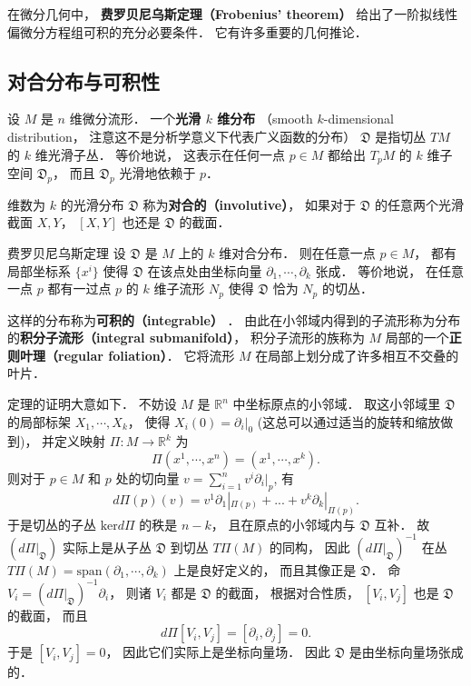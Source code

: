 

在微分几何中， \textbf{费罗贝尼乌斯定理（Frobenius' theorem）} 给出了一阶拟线性偏微分方程组可积的充分必要条件． 它有许多重要的几何推论．

\subsection{对合分布与可积性}
设 $M$ 是 $n$ 维微分流形． 一个\textbf{光滑 $k$ 维分布} （smooth $k$-dimensional distribution， 注意这不是分析学意义下代表广义函数的分布） $\mathfrak{D}$ 是指切丛 $TM$ 的 $k$ 维光滑子丛． 等价地说， 这表示在任何一点 $p\in M$ 都给出 $T_pM$ 的 $k$ 维子空间 $\mathfrak{D}_p$， 而且 $\mathfrak{D}_p$ 光滑地依赖于 $p$．

维数为 $k$ 的光滑分布 $\mathfrak{D}$ 称为\textbf{对合的（involutive）}， 如果对于 $\mathfrak{D}$ 的任意两个光滑截面 $X,Y$， $[X,Y]$ 也还是 $\mathfrak{D}$ 的截面． 

\begin{theorem}{费罗贝尼乌斯定理}
设 $\mathfrak{D}$ 是 $M$ 上的 $k$ 维对合分布． 则在任意一点 $p\in M$， 都有局部坐标系 $\{x^i\}$ 使得 $\mathfrak{D}$ 在该点处由坐标向量 $\partial_1,\cdots ,\partial_k$ 张成． 等价地说， 在任意一点 $p$ 都有一过点 $p$ 的 $k$ 维子流形 $N_p$ 使得 $\mathfrak{D}$ 恰为 $N_p$ 的切丛．
\end{theorem}
这样的分布称为\textbf{可积的（integrable）} ． 由此在小邻域内得到的子流形称为分布的\textbf{积分子流形（integral submanifold）}， 积分子流形的族称为 $M$ 局部的一个\textbf{正则叶理（regular foliation）}． 它将流形 $M$ 在局部上划分成了许多相互不交叠的叶片．

定理的证明大意如下． 不妨设 $M$ 是 $\mathbb{R}^n$ 中坐标原点的小邻域． 取这小邻域里 $\mathfrak{D}$ 的局部标架 $X_1,\cdots ,X_k$， 使得 $X_i(0)=\partial_i|_0$ (这总可以通过适当的旋转和缩放做到)， 并定义映射 $\Pi: M\to \mathbb{R}^k$ 为
$$
\Pi(x^1,\cdots ,x^n)=(x^1,\cdots ,x^k).
$$
则对于 $p\in M$ 和 $p$ 处的切向量 $v=\sum_{i=1}^nv^i\partial_i|_p$, 有
$$
d\Pi(p)(v)=v^1\partial_1|_{\Pi(p)}+...+v^k\partial_k|_{\Pi(p)}.
$$
于是切丛的子丛 $\text{ker}d\Pi$ 的秩是 $n-k$， 且在原点的小邻域内与 $\mathfrak{D}$ 互补． 故 $(d\Pi|_{\mathfrak{D}})$ 实际上是从子丛 $\mathfrak{D}$ 到切丛 $T\Pi(M)$ 的同构， 因此 $(d\Pi|_{\mathfrak{D}})^{-1}$ 在丛 $T\Pi(M)=\text{span}(\partial_1,\cdots ,\partial_k)$ 上是良好定义的， 而且其像正是 $\mathfrak{D}$． 命 $V_i=(d\Pi|_{\mathfrak{D}})^{-1}\partial_i$， 则诸 $V_i$ 都是 $\mathfrak{D}$ 的截面， 根据对合性质， $[V_i,V_j]$ 也是 $\mathfrak{D}$ 的截面， 而且
$$
d\Pi[V_i,V_j]=[\partial_i,\partial_j]=0.
$$
于是 $[V_i,V_j]=0$， 因此它们实际上是坐标向量场． 因此 $\mathfrak{D}$ 是由坐标向量场张成的．

